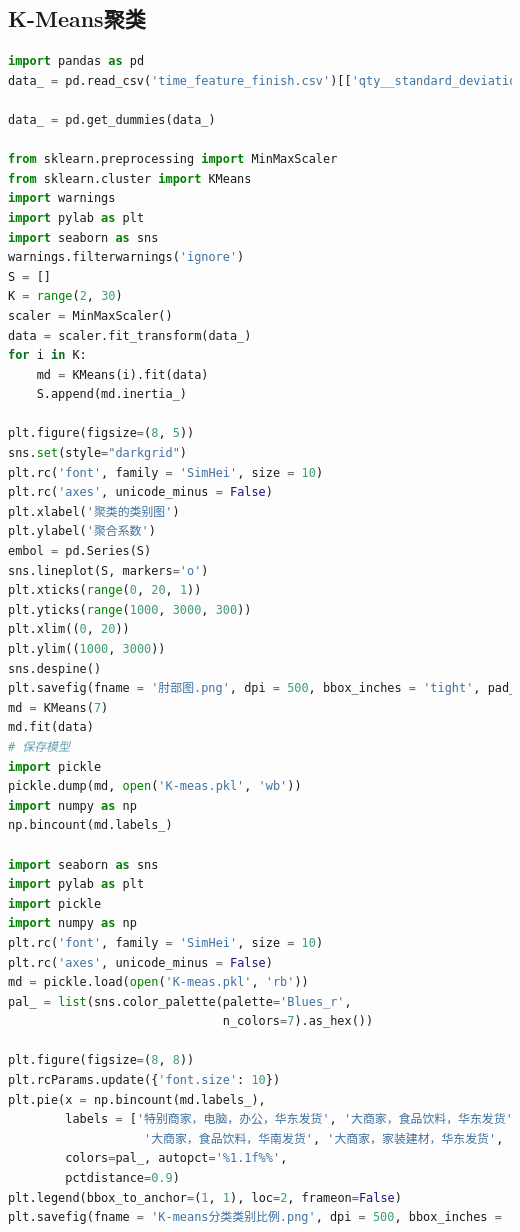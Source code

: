 \documentclass[withoutpreface,bwprint]{cumcmthesis}
\begin{document}
\subsection*{K-Means聚类}
\begin{lstlisting}[language=python]
import pandas as pd
data_ = pd.read_csv('time_feature_finish.csv')[['qty__standard_deviation', 'qty__mean', 'seller_level', 'warehouse _region', 'category1']]

data_ = pd.get_dummies(data_)

from sklearn.preprocessing import MinMaxScaler
from sklearn.cluster import KMeans
import warnings
import pylab as plt
import seaborn as sns
warnings.filterwarnings('ignore')
S = []
K = range(2, 30)
scaler = MinMaxScaler()
data = scaler.fit_transform(data_)
for i in K:
    md = KMeans(i).fit(data)
    S.append(md.inertia_)

plt.figure(figsize=(8, 5))
sns.set(style="darkgrid")
plt.rc('font', family = 'SimHei', size = 10)
plt.rc('axes', unicode_minus = False)
plt.xlabel('聚类的类别图')
plt.ylabel('聚合系数')
embol = pd.Series(S)
sns.lineplot(S, markers='o')
plt.xticks(range(0, 20, 1))
plt.yticks(range(1000, 3000, 300))
plt.xlim((0, 20))
plt.ylim((1000, 3000))
sns.despine()
plt.savefig(fname = '肘部图.png', dpi = 500, bbox_inches = 'tight', pad_inches = 0.0)
md = KMeans(7)
md.fit(data)
# 保存模型
import pickle
pickle.dump(md, open('K-meas.pkl', 'wb'))
import numpy as np
np.bincount(md.labels_)

import seaborn as sns
import pylab as plt
import pickle
import numpy as np
plt.rc('font', family = 'SimHei', size = 10)
plt.rc('axes', unicode_minus = False)
md = pickle.load(open('K-meas.pkl', 'rb'))
pal_ = list(sns.color_palette(palette='Blues_r',
                              n_colors=7).as_hex())

plt.figure(figsize=(8, 8))
plt.rcParams.update({'font.size': 10})
plt.pie(x = np.bincount(md.labels_),
        labels = ['特别商家，电脑，办公，华东发货', '大商家，食品饮料，华东发货', '大商家，食品饮料，华北发货',
                   '大商家，食品饮料，华南发货', '大商家，家装建材，华东发货', '大商家，食品饮料，西南发货', '宠物，华中发货'],
        colors=pal_, autopct='%1.1f%%',
        pctdistance=0.9)
plt.legend(bbox_to_anchor=(1, 1), loc=2, frameon=False)
plt.savefig(fname = 'K-means分类类别比例.png', dpi = 500, bbox_inches = 'tight', pad_inches = 0.0)

\end{lstlisting}
\end{document}
